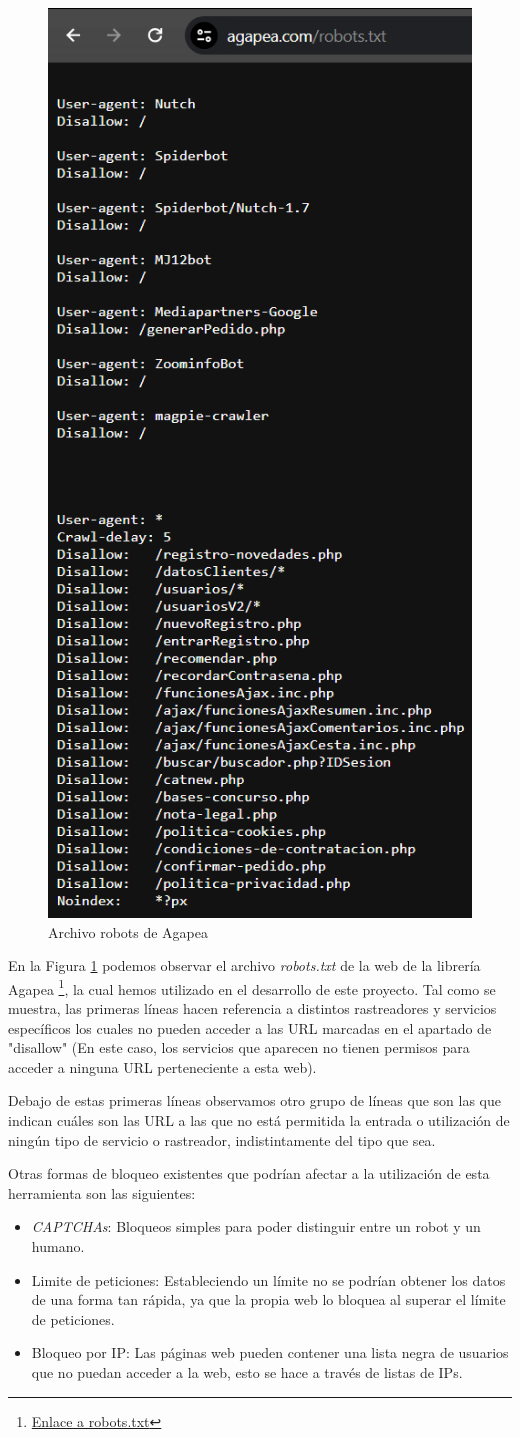 \begin{figure}[htbp]
    \centering
    \includegraphics[width=0.5\linewidth]{Imagenes/RobotsAgapea.png}
    \caption{Archivo robots de Agapea}
    \label{Archivo robots de Agapea}
\end{figure}
\FloatBarrier
En la Figura \ref{Archivo robots de Agapea} podemos observar el archivo \textit{robots.txt} de la web de la librería Agapea \footnote{\href{https://www.agapea.com/robots.txt}{Enlace a robots.txt}}, la cual hemos utilizado en el desarrollo de este proyecto. Tal como se muestra, las primeras líneas hacen referencia a distintos rastreadores y servicios específicos los cuales no pueden acceder a las URL marcadas en el apartado de "disallow" (En este caso, los servicios que aparecen no tienen permisos para acceder a ninguna URL perteneciente a esta web).

Debajo de estas primeras líneas observamos otro grupo de líneas que son las que indican cuáles son las URL a las que no está permitida la entrada o utilización de ningún tipo de servicio o rastreador, indistintamente del tipo que sea.

Otras formas de bloqueo existentes que podrían afectar a la utilización de esta herramienta son las siguientes:
\begin{itemize}
    \item \textit{CAPTCHAs}:  Bloqueos simples para poder distinguir entre un robot y un humano.
    \item Limite de peticiones: Estableciendo un límite no se podrían obtener los datos de una forma tan rápida, ya que la propia web lo bloquea al superar el límite de peticiones.
    \item Bloqueo por IP: Las páginas web pueden contener una lista negra de usuarios que no puedan acceder a la web, esto se hace a través de listas de IPs.
\end{itemize}

